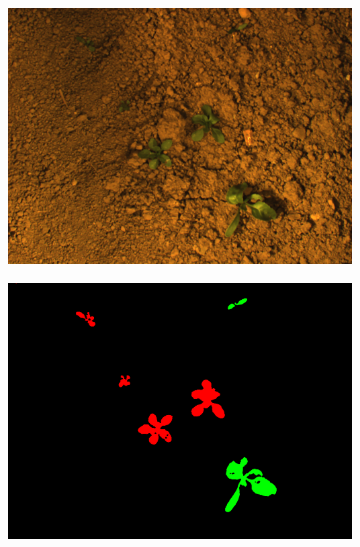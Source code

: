 \documentclass[letterpaper, 10 pt, conference]{ieeeconf}  %
\begin{document}
\begin{figure}
\begin{subfigure}[b]{0.49\linewidth}
    \vspace{1em}
   \end{subfigure}
        \begin{subfigure}[b]{0.49\linewidth}
    \includegraphics[width=\linewidth]{pics/stuttgart/images/masks_8mm_fromImages_frame479.png}
   		\caption{}
		\label{stuttgart_img}    		
    \vspace{1em}
   \end{subfigure}
        \begin{subfigure}[b]{0.49\linewidth}
    \includegraphics[width=\linewidth]{pics/stuttgart/annotations/masks_8mm_fromImages_frame479_GroundTruth_iMap.png}
   		\caption{}
		\label{stuttgart_lbl}    		
    \vspace{1em}

\end{subfigure}
\end{figure}
\end{document}
